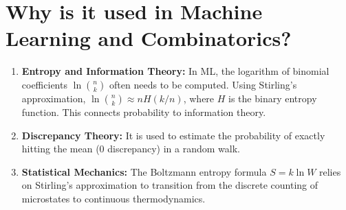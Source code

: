 \documentclass[11pt]{article}
\begin{document}
\section{Why is it used in Machine Learning and Combinatorics?}
\begin{enumerate}
    \item \textbf{Entropy and Information Theory:} In ML, the logarithm of binomial coefficients \(\ln \binom{n}{k}\) often needs to be computed. Using Stirling's approximation, \(\ln \binom{n}{k} \approx n H(k/n)\), where \(H\) is the binary entropy function. This connects probability to information theory.
    \item \textbf{Discrepancy Theory:} It is used to estimate the probability of exactly hitting the mean (0 discrepancy) in a random walk. 
    \item \textbf{Statistical Mechanics:} The Boltzmann entropy formula \(S = k \ln W\) relies on Stirling's approximation to transition from the discrete counting of microstates to continuous thermodynamics.
\end{enumerate}
\end{document}
